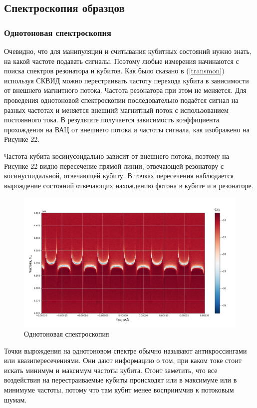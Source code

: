 \subsection{Спектроскопия образцов}
\subsubsection{Однотоновая спектроскопия}\label{sigletone}
Очевидно, что для манипуляции и считывания кубитных состояний нужно знать, на какой частоте подавать сигналы. Поэтому любые измерения начинаются с поиска спектров резонатора и кубитов. Как было сказано в (\ref{transmon}) используя СКВИД можно перестраивать частоту перехода кубита в зависимости от внешнего магнитного потока. Частота резонатора при этом не меняется. Для проведения однотоновой спектроскопии  последовательно подаётся сигнал на разных частотах и меняется внешний магнитный поток с использованием постоянного тока. В результате получается зависимость коэффициента прохождения на ВАЦ от внешнего потока и частоты сигнала, как изображено на Рисунке 22. 

Частота кубита косинусоидально зависит от внешнего потока, поэтому на Рисунке 22 видно пересечение прямой линии, отвечающей резонатору с косинусоидальной, отвечающей кубиту. В точках пересечения наблюдается вырождение состояний отвечающих нахождению фотона в кубите и в резонаторе. 

\begin{figure}[t]
	\centering
	\includegraphics[width=0.9\linewidth]{pictures/anticross_6_39}
	\caption{Однотоновая спектроскопия}
	\label{fig:anticross639}
\end{figure}

Точки вырождения на однотоновом спектре обычно называют антикроссингами или квазипересечениями. Они дают информацию о том, при каком токе стоит искать минимум и максимум частоты кубита. Стоит заметить, что все воздействия на перестраиваемые кубиты происходят или в максимуме или в минимуме частоты, потому что там кубит менее восприимчив к потоковым шумам. 

